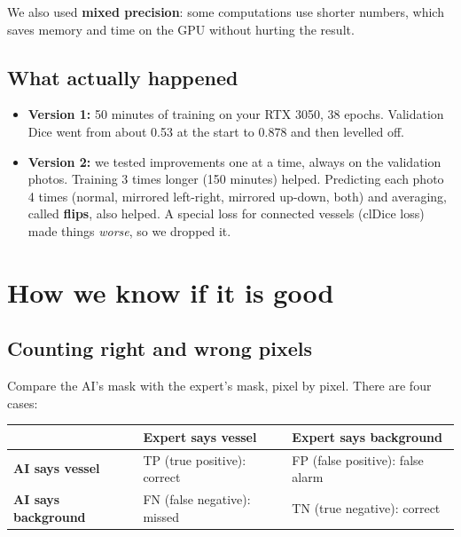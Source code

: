 \documentclass[11pt,a4paper]{article}
\begin{document}
We also used \textbf{mixed precision}: some computations use shorter numbers, which saves memory and time on the GPU without hurting the result.

\subsection{What actually happened}
\begin{itemize}
  \item \textbf{Version 1:} 50 minutes of training on your RTX 3050, 38 epochs. Validation Dice went from about 0.53 at the start to 0.878 and then levelled off.
  \item \textbf{Version 2:} we tested improvements one at a time, always on the validation photos. Training 3 times longer (150 minutes) helped. Predicting each photo 4 times (normal, mirrored left-right, mirrored up-down, both) and averaging, called \textbf{flips}, also helped. A special loss for connected vessels (clDice loss) made things \emph{worse}, so we dropped it.
\end{itemize}

\section{How we know if it is good}\label{sec:metrics-anchor}

\subsection{Counting right and wrong pixels}
Compare the AI's mask with the expert's mask, pixel by pixel. There are four cases:
\begin{center}
\begin{tabular}{@{}lll@{}}
\toprule
 & \textbf{Expert says vessel} & \textbf{Expert says background} \\
\midrule
\textbf{AI says vessel} & TP (true positive): correct & FP (false positive): false alarm \\
\textbf{AI says background} & FN (false negative): missed & TN (true negative): correct \\
\bottomrule
\end{tabular}
\end{center}
\end{document}
